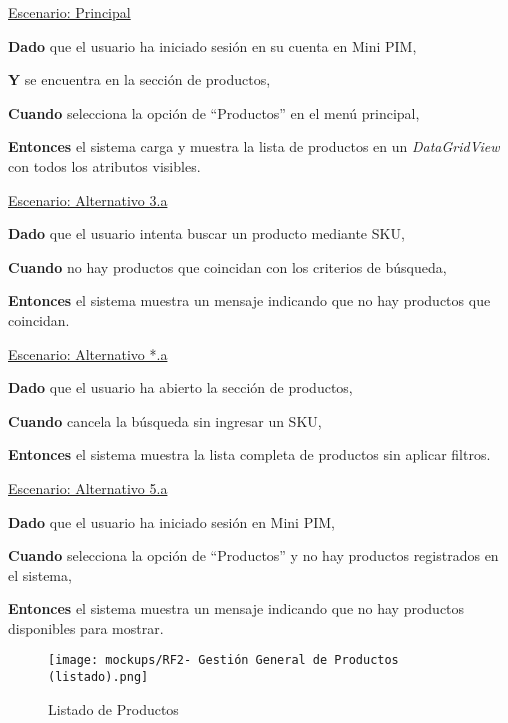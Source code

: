 \underline{Escenario: Principal}\par
\vspace{0.15cm}
\textbf{Dado} que el usuario ha iniciado sesión en su cuenta en Mini PIM,\par
\textbf{Y} se encuentra en la sección de productos,\par
\textbf{Cuando} selecciona la opción de “Productos” en el menú principal,\par
\textbf{Entonces} el sistema carga y muestra la lista de productos en un \textit{DataGridView} con todos los atributos visibles.\par
\vspace{0.20cm}

\underline{Escenario: Alternativo 3.a}\par
\vspace{0.15cm}
\textbf{Dado} que el usuario intenta buscar un producto mediante SKU,\par
\textbf{Cuando} no hay productos que coincidan con los criterios de búsqueda,\par
\textbf{Entonces} el sistema muestra un mensaje indicando que no hay productos que coincidan.\par
\vspace{0.20cm}

\underline{Escenario: Alternativo *.a}\par
\vspace{0.15cm}
\textbf{Dado} que el usuario ha abierto la sección de productos,\par
\textbf{Cuando} cancela la búsqueda sin ingresar un SKU,\par
\textbf{Entonces} el sistema muestra la lista completa de productos sin aplicar filtros.\par
\vspace{0.20cm}

\underline{Escenario: Alternativo 5.a}\par
\vspace{0.15cm}
\textbf{Dado} que el usuario ha iniciado sesión en Mini PIM,\par
\textbf{Cuando} selecciona la opción de “Productos” y no hay productos registrados en el sistema,\par
\textbf{Entonces} el sistema muestra un mensaje indicando que no hay productos disponibles para mostrar.\par
\vspace{0.20cm}


\begin{figure}[H]
    \texttt{[image: mockups/RF2- Gestión General de Productos (listado).png]}
    \caption{Listado de Productos}
   \end{figure}
\vspace{1.0cm}

\newpage %